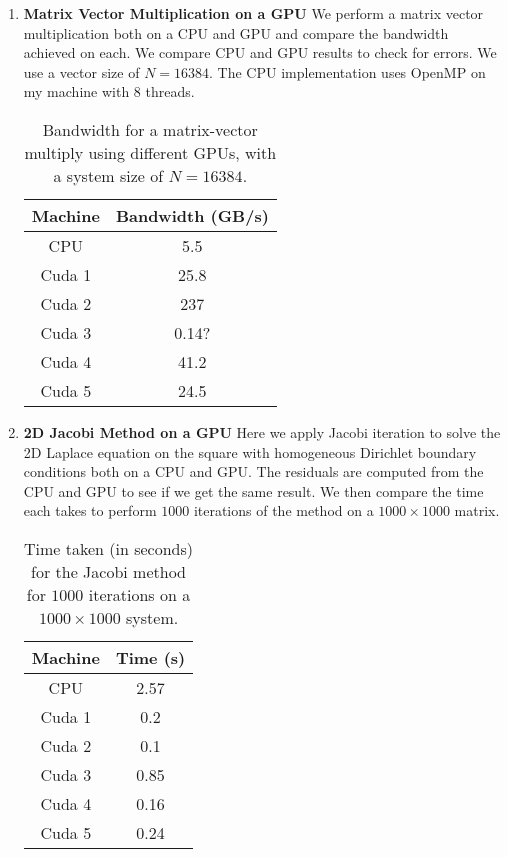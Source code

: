 \documentclass[11pt]{article}
\begin{document}
\begin{enumerate}

\item {\bf Matrix Vector Multiplication on a GPU} We perform a matrix vector multiplication both on a CPU and GPU and compare the bandwidth achieved on each. We compare CPU and GPU results to check for errors. We use a vector size of $N = 16384$. The CPU implementation uses OpenMP on my machine with $8$ threads.

\begin{table}[h!] 
	\centering
	\begin{tabular}{c | c}
		Machine & Bandwidth (GB/s)  \\
		\hline
		CPU & 5.5\\
		Cuda 1 & 25.8\\ 
		Cuda 2 & 237\\
		Cuda 3 & 0.14?\\
		Cuda 4 & 41.2\\
		Cuda 5 & 24.5\\
	\end{tabular}
	\caption{Bandwidth for a matrix-vector multiply using different GPUs, with a system size of $N=16384$. }
\end{table}


\item {\bf 2D Jacobi Method on a GPU} Here we apply Jacobi iteration to solve the 2D Laplace equation on the square with homogeneous Dirichlet boundary conditions both on a CPU and GPU. The residuals are computed from the CPU and GPU to see if we get the same result. We then compare the time each takes to perform $1000$ iterations of the method on a $1000\times 1000$ matrix. 

\begin{table}[h!] 
	\centering
	\begin{tabular}{c | c}
		Machine & Time (s)  \\
		\hline
		CPU & 2.57\\
		Cuda 1 & 0.2\\ 
		Cuda 2 & 0.1\\
		Cuda 3 & 0.85\\
		Cuda 4 & 0.16\\
		Cuda 5 & 0.24\\
	\end{tabular}
	\caption{Time taken (in seconds) for the Jacobi method for $1000$ iterations on a $1000\times 1000$ system. }
\end{table}


\end{enumerate}
\end{document}
